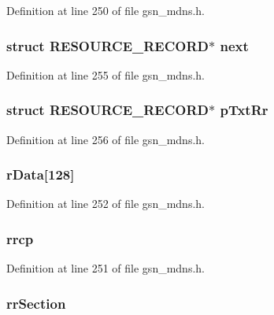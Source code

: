 Definition at line 250 of file gsn\_\-mdns.h.

\hypertarget{a00457_a6c92670be2b64f157da77fd6fdaa10cd}{
\subsubsection[{next}]{\setlength{\rightskip}{0pt plus 5cm}struct {\bf RESOURCE\_\-RECORD}$\ast$ {\bf next}}}
\label{a00457_a6c92670be2b64f157da77fd6fdaa10cd}


Definition at line 255 of file gsn\_\-mdns.h.

\hypertarget{a00457_a9e8e74a6a032325019d2ed0fd3601618}{
\subsubsection[{pTxtRr}]{\setlength{\rightskip}{0pt plus 5cm}struct {\bf RESOURCE\_\-RECORD}$\ast$ {\bf pTxtRr}}}
\label{a00457_a9e8e74a6a032325019d2ed0fd3601618}


Definition at line 256 of file gsn\_\-mdns.h.

\hypertarget{a00457_a81be43ad7df64a2c6a5d4ab8a7b9d395}{
\subsubsection[{rData}]{ {\bf rData}\mbox{[}128\mbox{]}}}
\label{a00457_a81be43ad7df64a2c6a5d4ab8a7b9d395}


Definition at line 252 of file gsn\_\-mdns.h.

\hypertarget{a00457_a2d95b266f79e4a5bc30d739e0e0a2d80}{
\subsubsection[{rrcp}]{ {\bf rrcp}}}
\label{a00457_a2d95b266f79e4a5bc30d739e0e0a2d80}


Definition at line 251 of file gsn\_\-mdns.h.

\hypertarget{a00457_ae146e21a8c302dfab8bd9abeea5c22c8}{
\subsubsection[{rrSection}]{ {\bf rrSection}}}
\label{a00457_ae146e21a8c302dfab8bd9abeea5c22c8}


